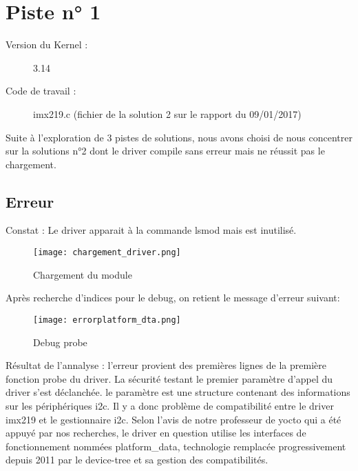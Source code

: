 \chapter{Piste n° 1} %
\label{Chapter2} %

\begin{description}
  \item[Version du Kernel :] 3.14
  \item[Code de travail :] imx219.c (fichier de la solution 2 sur le rapport du
  09/01/2017)
\end{description}

Suite à l'exploration de 3 pistes de solutions, nous avons choisi de nous
concentrer sur la solutions n°2 dont le driver compile sans erreur mais ne
réussit pas le chargement.

\section{Erreur}
Constat : Le driver apparait à la commande lsmod mais est inutilisé.

 \begin{figure}[th]
   \centering
   \texttt{[image: chargement\_driver.png]}
   \decoRule
   \caption{Chargement du module}  \label{fig:planning}
\end{figure}

Après recherche d'indices pour le debug, on retient le message d'erreur suivant:
\begin{figure}[th]
  \centering
  \texttt{[image: errorplatform\_dta.png]}
  \decoRule
  \caption{Debug probe}  \label{fig:planning}
\end{figure}

Résultat de l'annalyse :
l'erreur provient des premières lignes de la première fonction probe du driver. La
sécurité testant le premier paramètre d'appel du driver s'est déclanchée. le
paramètre est une structure contenant des informations sur les périphériques i2c.
Il y a donc problème de compatibilité entre le driver imx219 et le gestionnaire i2c. Selon
l'avis de notre professeur de yocto qui a été appuyé par nos recherches,
le driver en question utilise les interfaces de fonctionnement nommées
platform\_data, technologie remplacée progressivement depuis 2011 par le
device-tree et sa gestion des compatibilités.

